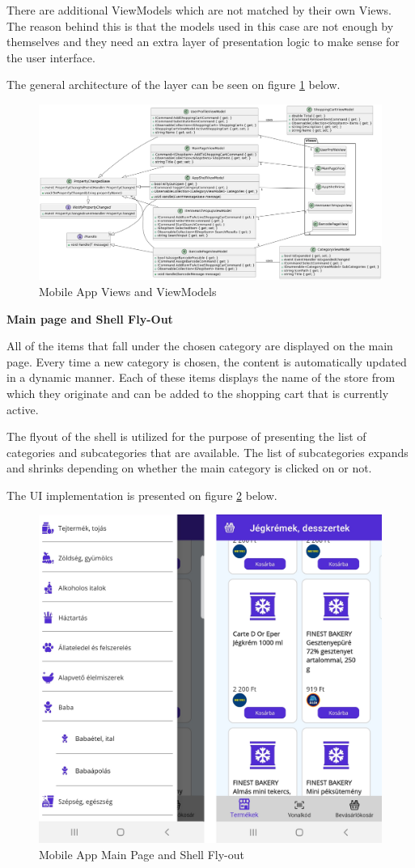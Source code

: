 There are additional ViewModels which are not matched by their own Views. The reason behind this is that the models used in this case are not enough by themselves and they need an extra layer of presentation logic to make sense for the user interface.

The general architecture of the layer can be seen on figure \ref{fig:appviewmodels} below.

\begin{figure}[H]
	\centering
	\includegraphics[width=1\linewidth]{img/app_viewmodels.png}
	\caption{Mobile App Views and ViewModels}
	\label{fig:appviewmodels}
\end{figure}

\noindent\textbf{Main page and Shell Fly-Out}

All of the items that fall under the chosen category are displayed on the main page. Every time a new category is chosen, the content is automatically updated in a dynamic manner. Each of these items displays the name of the store from which they originate and can be added to the shopping cart that is currently active. 

The flyout of the shell is utilized for the purpose of presenting the list of categories and subcategories that are available. The list of subcategories expands and shrinks depending on whether the main category is clicked on or not. 

The UI implementation is presented on figure \ref{fig:appitemspage} below.

\begin{figure}[H]
	\centering
	\includegraphics[width=0.5\linewidth]{img/app_itemspage.png}
	\caption{Mobile App Main Page and Shell Fly-out}
	\label{fig:appitemspage}
\end{figure}

